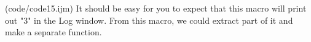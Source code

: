(code/code15.ijm)
It should be easy for you to expect that this macro will print out "3" in the Log window. 
From this macro, we could extract part of it and make a separate function.